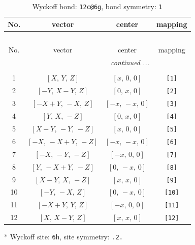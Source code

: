 \documentclass[fleqn,8pt]{jsarticle}
\begin{document}
\begin{longtable}{cccc}
\caption{Wyckoff bond: {\tt 12c@6g}, bond symmetry: {\tt 1}}
 \\
 \hline \hline
No. & vector & center & mapping \\ \hline \endfirsthead

\multicolumn{3}{l}{\tablename\ \thetable{}} \\
 \hline \hline
No. & vector & center & mapping \\ \hline \endhead

 \hline \hline
\multicolumn{3}{r}{\footnotesize\it continued ...} \\ \endfoot

 \hline \hline
\multicolumn{3}{r}{} \\ \endlastfoot

1 & $\left[ X,\, Y,\, Z \right]$ & $\left[ x,\, 0,\, 0 \right]$ & {\tt [1]} \\ \hline
2 & $\left[ - Y,\, X - Y,\, Z \right]$ & $\left[ 0,\, x,\, 0 \right]$ & {\tt [2]} \\ \hline
3 & $\left[ - X + Y,\, - X,\, Z \right]$ & $\left[ - x,\, - x,\, 0 \right]$ & {\tt [3]} \\ \hline
4 & $\left[ Y,\, X,\, - Z \right]$ & $\left[ 0,\, x,\, 0 \right]$ & {\tt [4]} \\ \hline
5 & $\left[ X - Y,\, - Y,\, - Z \right]$ & $\left[ x,\, 0,\, 0 \right]$ & {\tt [5]} \\ \hline
6 & $\left[ - X,\, - X + Y,\, - Z \right]$ & $\left[ - x,\, - x,\, 0 \right]$ & {\tt [6]} \\ \hline
7 & $\left[ - X,\, - Y,\, - Z \right]$ & $\left[ - x,\, 0,\, 0 \right]$ & {\tt [7]} \\ \hline
8 & $\left[ Y,\, - X + Y,\, - Z \right]$ & $\left[ 0,\, - x,\, 0 \right]$ & {\tt [8]} \\ \hline
9 & $\left[ X - Y,\, X,\, - Z \right]$ & $\left[ x,\, x,\, 0 \right]$ & {\tt [9]} \\ \hline
10 & $\left[ - Y,\, - X,\, Z \right]$ & $\left[ 0,\, - x,\, 0 \right]$ & {\tt [10]} \\ \hline
11 & $\left[ - X + Y,\, Y,\, Z \right]$ & $\left[ - x,\, 0,\, 0 \right]$ & {\tt [11]} \\ \hline
12 & $\left[ X,\, X - Y,\, Z \right]$ & $\left[ x,\, x,\, 0 \right]$ & {\tt [12]} \\
\end{longtable}
* Wyckoff site: {\tt 6h}, site symmetry: {\tt .2.}
\renewcommand{\arraystretch}{1.2}
\end{document}
